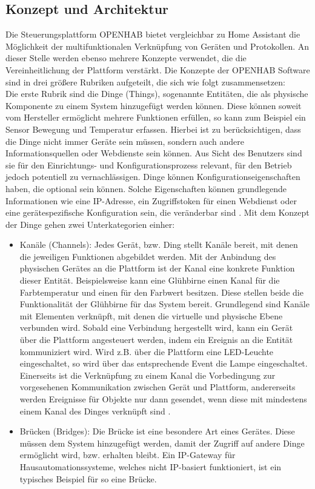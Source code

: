 \subsection{Konzept und Architektur}
    Die Steuerungsplattform \acs{OPENHAB} bietet vergleichbar zu Home Assistant die Möglichkeit der multifunktionalen Verknüpfung von 
    Geräten und Protokollen. An dieser Stelle werden ebenso mehrere Konzepte verwendet, die die Vereinheitlichung der Plattform 
    verstärkt. Die Konzepte der \acs{OPENHAB} Software sind in drei größere Rubriken aufgeteilt, die sich wie folgt zusammensetzen:
    \\
    \linebreak
    Die erste Rubrik sind die Dinge (Things), sogenannte Entitäten, die als physische Komponente zu einem System hinzugefügt werden können. 
    Diese können soweit vom Hersteller ermöglicht mehrere Funktionen erfüllen, so kann zum Beispiel ein Sensor Bewegung und Temperatur erfassen. 
    Hierbei ist zu berücksichtigen, dass die Dinge nicht 
    immer Geräte sein müssen, sondern auch andere Informationsquellen oder Webdienste sein können. 
    Aus Sicht des Benutzers sind sie für den Einrichtungs- und Konfigurationsprozess relevant, für den Betrieb 
    jedoch potentiell zu vernachlässigen. Dinge können Konfigurationseigenschaften haben, die optional sein 
    können. Solche Eigenschaften können grundlegende Informationen wie eine IP-Adresse, ein Zugriffstoken für einen Webdienst 
    oder eine gerätespezifische Konfiguration sein, die veränderbar sind \cite{openHAB-article}. Mit dem Konzept der Dinge 
    gehen zwei Unterkategorien einher:
    \begin{itemize}
        \item Kanäle (Channels): Jedes Gerät, bzw. Ding stellt Kanäle bereit, mit denen die jeweiligen Funktionen abgebildet werden. 
        Mit der Anbindung des physischen Gerätes an die Plattform ist der Kanal eine konkrete Funktion dieser Entität. Beispielsweise 
        kann eine Glühbirne einen Kanal für die Farbtemperatur und einen für den Farbwert besitzen. Diese stellen beide die 
        Funktionalität der Glühbirne für das System bereit. Grundlegend sind Kanäle mit Elementen verknüpft, mit denen 
        die virtuelle und physische Ebene verbunden wird. Sobald eine Verbindung hergestellt wird, kann ein Gerät über die Plattform 
        angesteuert werden, indem ein Ereignis an die Entität kommuniziert wird. Wird z.B. über die Plattform eine LED-Leuchte eingeschaltet, so 
        wird über das entsprechende Event die Lampe eingeschaltet. Einerseits ist die Verknüpfung zu einem Kanal die Vorbedingung zur vorgesehenen 
        Kommunikation zwischen Gerät und Plattform, andererseits werden Ereignisse für Objekte nur dann gesendet, wenn diese 
        mit mindestens einem Kanal des Dinges verknüpft sind \cite{openHAB-article}.
        \item Brücken (Bridges): Die Brücke ist eine besondere Art eines Gerätes. Diese müssen dem System hinzugefügt werden, damit der 
        Zugriff auf andere Dinge ermöglicht wird, bzw. erhalten bleibt. Ein IP-Gateway für Hausautomationssysteme, welches nicht 
        IP-basiert funktioniert, ist ein typisches Beispiel für so eine Brücke.
    \end{itemize}
